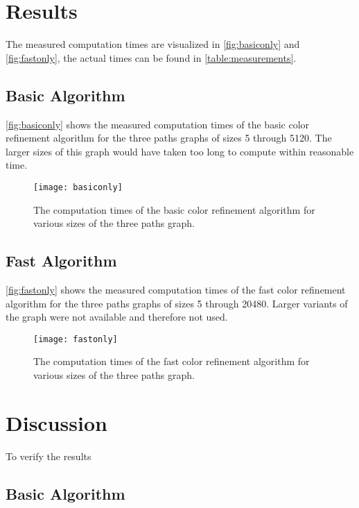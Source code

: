 \documentclass[twoside]{article}
\begin{document}
\begin{multicols}{2}
\section{Results}
\label{results}
The measured computation times are visualized in \autoref{fig:basiconly} and \autoref{fig:fastonly}, the actual times can be found in \autoref{table:measurements}.

\subsection{Basic Algorithm}
\autoref{fig:basiconly} shows the measured computation times of the basic color refinement algorithm for the three paths graphs of sizes 5 through 5120. The larger sizes of this graph would have taken too long to compute within reasonable time.

\begin{figure}[H]
	\texttt{[image: basiconly]}
	\caption{The computation times of the basic color refinement algorithm for various sizes of the three paths graph.}
	\label{fig:basiconly}
\end{figure}

\subsection{Fast Algorithm}
\autoref{fig:fastonly} shows the measured computation times of the fast color refinement algorithm for the three paths graphs of sizes 5 through 20480. Larger variants of the graph were not available and therefore not used.

\begin{figure}[H]
	\texttt{[image: fastonly]}
	\caption{The computation times of the fast color refinement algorithm for various sizes of the three paths graph.}
	\label{fig:fastonly}
\end{figure}

\section{Discussion} %
\label{disc}
To verify the results 

\subsection{Basic Algorithm}


\end{multicols}
\end{document}
